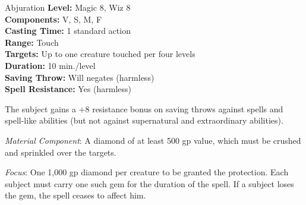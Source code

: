 {Abjuration}
{
	\textbf{Level:}
	Magic 8, Wiz 8\\
	\textbf{Components:}
	V, S, M, F\\
	\textbf{Casting Time:}
	1 standard action\\
	\textbf{Range:}
	Touch\\
	\textbf{Targets:}
	Up to one creature touched per four levels\\
	\textbf{Duration:}
	10 min./level\\
	\textbf{Saving Throw:}
	Will negates (harmless)\\
	\textbf{Spell Resistance:}
	Yes (harmless)\\
}
{
	The subject gains a +8 resistance bonus on saving throws against spells and spell-like abilities (but not against supernatural and extraordinary abilities).

	\textit{Material Component}:
	A diamond of at least 500 gp value, which must be crushed and sprinkled over the targets.

	\textit{Focus}:
	One 1,000 gp diamond per creature to be granted the protection. Each subject must carry one such gem for the duration of the spell. If a subject loses the gem, the spell ceases to affect him.

}
